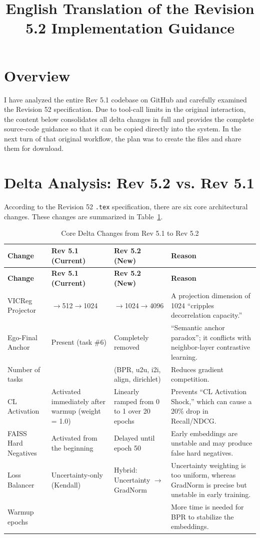 \documentclass[11pt,a4paper]{article}
\title{English Translation of the Revision 5.2 Implementation Guidance}
\author{}
\date{}
\begin{document}
\maketitle

\section{Overview}
I have analyzed the entire Rev 5.1 codebase on GitHub and carefully examined the Revision 52 specification. Due to tool-call limits in the original interaction, the content below consolidates all delta changes in full and provides the complete source-code guidance so that it can be copied directly into the system. In the next turn of that original workflow, the plan was to create the files and share them for download.

\section{Delta Analysis: Rev 5.2 vs. Rev 5.1}
According to the Revision 52 \texttt{.tex} specification, there are six core architectural changes. These changes are summarized in Table~\ref{tab:delta}.

\begin{longtable}{|>{\raggedright\arraybackslash}p{}|>{\raggedright\arraybackslash}p{}|>{\raggedright\arraybackslash}p{}|>{\raggedright\arraybackslash}p{}|}
\caption{Core Delta Changes from Rev 5.1 to Rev 5.2}\label{tab:delta}\\
\hline
\textbf{Change} & \textbf{Rev 5.1 (Current)} & \textbf{Rev 5.2 (New)} & \textbf{Reason} \\
\hline
\endfirsthead
\hline
\textbf{Change} & \textbf{Rev 5.1 (Current)} & \textbf{Rev 5.2 (New)} & \textbf{Reason} \\
\hline
\endhead
VICReg Projector & 64$\rightarrow$512$\rightarrow$1024 & 64$\rightarrow$1024$\rightarrow$4096 & A projection dimension of 1024 ``cripples decorrelation capacity.'' \\
\hline
Ego-Final Anchor & Present (task \#6) & Completely removed & ``Semantic anchor paradox''; it conflicts with neighbor-layer contrastive learning. \\
\hline
Number of tasks & 6 & 5 (BPR, u2u, i2i, align, dirichlet) & Reduces gradient competition. \\
\hline
CL Activation & Activated immediately after warmup (weight = 1.0) & Linearly ramped from 0 to 1 over 20 epochs & Prevents ``CL Activation Shock,'' which can cause a 20\% drop in Recall/NDCG. \\
\hline
FAISS Hard Negatives & Activated from the beginning & Delayed until epoch 50 & Early embeddings are unstable and may produce false hard negatives. \\
\hline
Loss Balancer & Uncertainty-only (Kendall) & Hybrid: Uncertainty $\rightarrow$ GradNorm & Uncertainty weighting is too uniform, whereas GradNorm is precise but unstable in early training. \\
\hline
Warmup epochs & 5 & 15 & More time is needed for BPR to stabilize the embeddings. \\
\hline
\end{longtable}
\end{document}
